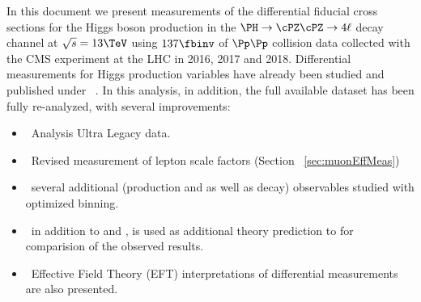 In this document we present measurements of the differential fiducial cross sections for the Higgs boson production in the $\HZZfl$ decay channel at $\sqrt{s}=13\TeV$ using $\usedLumiABC$ of $\Pp\Pp$ collision data collected with the CMS experiment at the LHC in 2016, 2017 and 2018.
Differential measurements for Higgs production variables have already been studied and published under ~\cite{CMS-PAS-HIG-19-001}. In this analysis, in addition, the full available dataset has been fully re-analyzed, with several improvements: 
\begin{itemize}
\item~Analysis Ultra Legacy data.
\item~Revised measurement of lepton scale factors (Section ~\ref{sec:muonEffMeas}) %
\item~several additional (production and as well as decay) observables studied with optimized binning.
\item~in addition to  and ,  is used as additional theory prediction to for comparision of the observed results.
\item~Effective Field Theory (EFT) interpretations of differential measurements are also presented.
\end{itemize}

